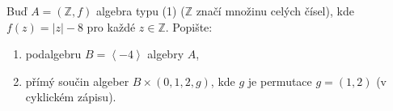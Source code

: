Buď $A=(\mathbb{Z},f)$ algebra typu (1) ($\mathbb{Z}$ značí množinu celých
čísel), kde $f(z) = |z| -8$ pro každé $z \in \mathbb{Z}$. Popište:

\begin{enumerate}
  \item podalgebru $B = \left \langle  {-4} \right \rangle$ algebry $A$,
  \item přímý součin algeber $B \times ({0,1,2}, g)$, kde $g$ je permutace
  $g=(1,2)$ (v cyklickém zápisu).
\end{enumerate}
